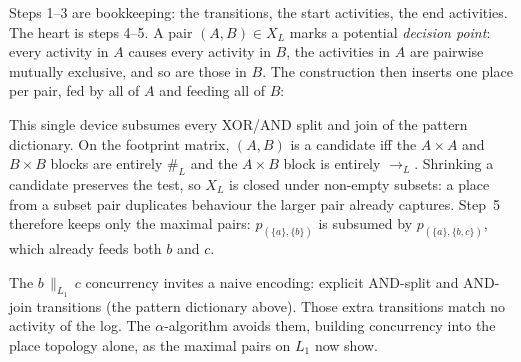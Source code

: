 Steps 1--3 are bookkeeping: the transitions, the start activities, the end activities. The heart is steps 4--5. A pair $(A, B) \in X_L$ marks a potential \emph{decision point}: every activity in $A$ causes every activity in $B$, the activities in $A$ are pairwise mutually exclusive, and so are those in $B$. The construction then inserts one place per pair, fed by all of $A$ and feeding all of $B$:
\begin{center}
\end{center}
This single device subsumes every XOR/AND split and join of the pattern dictionary. On the footprint matrix, $(A, B)$ is a candidate iff the $A \times A$ and $B \times B$ blocks are entirely $\#_L$ and the $A \times B$ block is entirely $\to_L$. Shrinking a candidate preserves the test, so $X_L$ is closed under non-empty subsets: a place from a subset pair duplicates behaviour the larger pair already captures. Step~5 therefore keeps only the maximal pairs: $p_{(\{a\}, \{b\})}$ is subsumed by $p_{(\{a\}, \{b, c\})}$, which already feeds both $b$ and $c$.

The $b \,\|_{L_1}\, c$ concurrency invites a naive encoding: explicit AND-split and AND-join transitions (the pattern dictionary above). Those extra transitions match no activity of the log. The $\alpha$-algorithm avoids them, building concurrency into the place topology alone, as the maximal pairs on $L_1$ now show.

